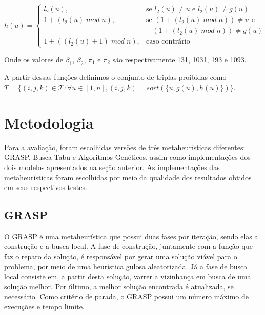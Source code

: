 \documentclass{MO824}
\begin{document}
    
    \begin{equation*}
    h(u) = \begin{cases} l_2(u), & \mbox{se } l_2(u) \neq u  \mbox{ e } l_2(u) \neq g(u)\\
                        1 + (l_2(u) \; mod \; n), & \mbox{se } (1+(l_2(u) \; mod \; n)) \neq u  \mbox{ e } \\ & ~~~~(1+(l_2(u) \; mod \; n)) \neq g(u)\\
                        1 + ((l_2(u)+1) \; mod \; n), & \mbox{caso contrário } \end{cases}
    \end{equation*}

    Onde os valores de $\beta_1$, $\beta_2$, $\pi_1$ e $\pi_2$ são respectivamente 131, 1031, 193 e 1093.
    
    A partir dessas funções definimos o conjunto de triplas proibidas como $T = \{(i,j,k)\in \mathcal{T} : 
    \forall u \in [1,n],  (i,j,k) = sort(\{u, g(u), h(u)\})\}$.

\section{Metodologia} \label{method}
Para a avaliação, foram escolhidas versões de três metaheurísticas diferentes: GRASP, Busca Tabu e Algoritmos Genéticos, assim como implementações dos dois modelos apresentados na seção anterior. As implementações das metaheurísticas foram escolhidas por meio da qualidade dos resultados obtidos em seus respectivos testes.

\subsection{GRASP} \label{grasp}
O GRASP é uma metaheurística que possui duas fases por iteração, sendo elas a construção e a busca local. A fase de construção, juntamente com a função que faz o reparo da solução, é responsável por gerar uma solução viável para o problema, por meio de uma heurística gulosa aleatorizada. Já a fase de busca local consiste em, a partir desta solução, varrer a vizinhança em busca de uma solução melhor. Por último, a melhor solução encontrada é atualizada, se necessário. Como critério de parada, o GRASP possui um número máximo de execuções e tempo limite.
\end{document}
